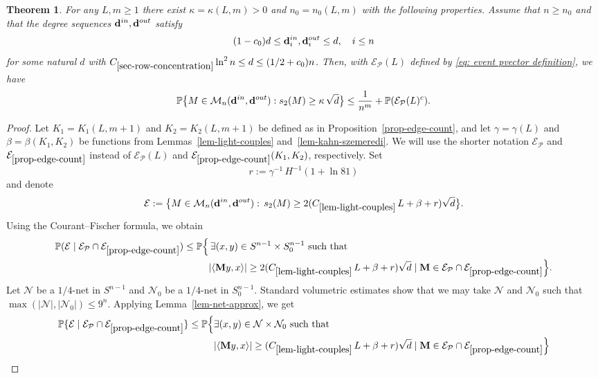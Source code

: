 \documentclass[12pt]{article}
\newtheorem{theorem}{Theorem}[section]
\theoremstyle{definition}
\theoremstyle{plain}
\newcommand{\Event}{\mathcal{E}}
\def\ranmtx{{\bf{}M}}
\def\Prob{{\mathbb P}}
\def\InDeg{{\bf d}^{in}}
\def\OutDeg{{\bf d}^{out}}
\def\MatrixSet{{\mathcal M}_n}
\def\pvector{{\mathcal P}}
\begin{document}
\begin{theorem}\label{th: main spectral gap}
For any $L, m\geq 1$ there exist $\kappa=\kappa(L,m)>0$ and $n_0=n_0(L,m)$ with the following properties.
Assume that $n\geq n_0$ and that the degree sequences $\InDeg,\OutDeg$ satisfy
$$(1-c_0)d\leq \InDeg_i,\OutDeg_i\leq d,\quad i\leq n$$
for some natural $d$ with $C_{\ref{sec-row-concentration}}\ln^2 n\leq d\leq (1/2+c_0)n$. 
Then, with $\Event_\pvector(L)$ defined by \eqref{eq: event pvector definition}, we have 
$$
\Prob\big\{M\in \MatrixSet(\InDeg, \OutDeg): s_2(M)\geq \kappa\, \sqrt{d}\big\}\leq \frac{1}{n^m}+\Prob(\Event_\pvector(L)^c).
$$
\end{theorem}

\begin{proof}
Let $K_1=K_1(L,m+1)$ and $K_2=K_2(L,m+1)$ be defined as in Proposition~\ref{prop-edge-count}, and
let $\gamma=\gamma(L)$ and $\beta=\beta(K_1,K_2)$ be functions
from Lemmas~\ref{lem-light-couples} and~\ref{lem-kahn-szemeredi}. 
We will use the shorter notation $\Event_{\pvector}$ and $\Event_{\ref{prop-edge-count}}$ instead of $\Event_{\pvector}(L)$ and 
$\Event_{\ref{prop-edge-count}}(K_1,K_2)$, respectively.
Set
$$r:=\gamma^{-1}\, H^{-1}(1+\ln 81)$$
and denote
$$
\Event:=\big\{M\in \MatrixSet(\InDeg, \OutDeg):\, s_2(M)\geq 2(C_{\ref{lem-light-couples}}\, L+ \beta+r)\sqrt{d}\big\}.
$$ 
Using the Courant--Fischer formula, we obtain
\begin{align*}
\Prob(\Event\mid \Event_{\pvector}\cap \Event_{\ref{prop-edge-count}})
\leq \Prob\Big\{& \,\exists (x,y)\in S^{n-1}\times S_0^{n-1}\text{ such that } \\ 
&\vert\langle \ranmtx y,x\rangle\vert\geq 2(C_{\ref{lem-light-couples}}\, L+ \beta+r)\sqrt{d}\mid 
\ranmtx\in \Event_{\pvector}\cap \Event_{\ref{prop-edge-count}}\Big\}.
\end{align*}
Let $\mathcal{N}$ be a $1/4$-net in $S^{n-1}$ and $\mathcal{N}_0$ be a $1/4$-net in $S_0^{n-1}$. 
Standard volumetric estimates show that we may take $\mathcal{N}$ and $\mathcal{N}_0$
such that $\max(\vert \mathcal{N}\vert, \vert \mathcal{N}_0\vert) \leq 9^n$. 
Applying Lemma~\ref{lem-net-approx}, we get
\begin{align}\label{eq1-proof-main-theorem}
\Prob\{\Event\mid \Event_{\pvector}\cap \Event_{\ref{prop-edge-count}}\}
\leq \Prob\Big\{&\exists (x,y)\in \mathcal{N}\times \mathcal{N}_0 \text{ such that }\nonumber\\ 
&
\vert\langle \ranmtx y,x\rangle\vert\geq (C_{\ref{lem-light-couples}}\, L+ \beta+r)
\sqrt{d}\mid \ranmtx\in\Event_{\pvector}\cap \Event_{\ref{prop-edge-count}}\Big\}\nonumber\\

\end{align}
\end{proof}
\end{document}
